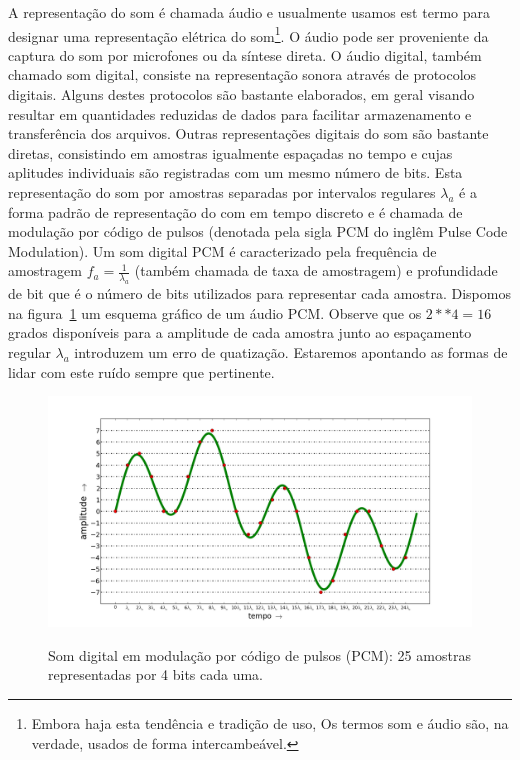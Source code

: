 A representação do som é chamada áudio e usualmente usamos est termo para designar uma representação elétrica do som\footnote{Embora haja esta tendência e tradição de uso, Os termos
som e áudio são, na verdade, usados de forma intercambeável.}. O áudio pode ser proveniente da captura do som por microfones ou da síntese direta. O áudio digital, também chamado som digital, consiste na representação sonora através de protocolos digitais. Alguns destes protocolos são bastante elaborados, em geral visando resultar em quantidades reduzidas de dados para facilitar armazenamento e transferência dos arquivos. Outras representações digitais do som são bastante diretas, consistindo em amostras igualmente espaçadas no tempo e cujas aplitudes individuais são registradas com um mesmo número de bits. Esta representação do som por amostras separadas por intervalos regulares $\lambda_a$ é a forma padrão de representação do com em tempo discreto e é chamada de modulação por código de pulsos (denotada pela sigla PCM do inglêm Pulse Code Modulation).
Um som digital PCM é caracterizado pela frequência de amostragem $f_a=\frac{1}{\lambda_a}$ (também chamada de taxa de amostragem) e profundidade de bit que é o número de bits utilizados para representar cada amostra. Dispomos na figura~\ref{fig:PCM} um esquema gráfico de um áudio PCM. Observe que os $2**4=16$ grados disponíveis para a amplitude de cada amostra junto ao espaçamento regular $\lambda_a$ introduzem um erro de quatização. Estaremos apontando as formas de lidar com este ruído sempre que pertinente.


\begin{figure}[h!]
    \centering
    \caption{Som digital em modulação por código de pulsos (PCM): 25 amostras representadas por 4 bits cada uma.}
        \includegraphics[width=\textwidth]{figuras/pcm}
        \label{fig:PCM}
\end{figure}

